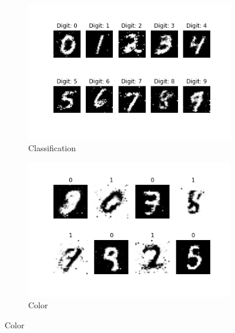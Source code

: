\documentclass[11pt, letterpaper, oneside]{article}
\begin{document}
\begin{figure}
    \begin{subfigure}{.5\textwidth}
      \centering
      \includegraphics[width=1\linewidth]{classification.png}  
      \caption{Classification}
      \label{fig:sub-first}
    \end{subfigure}
    \begin{subfigure}{.5\textwidth}
      \centering
      \includegraphics[width=1\linewidth]{inv.png}  
      \caption{Color}
      \label{fig:sub-second}
    \end{subfigure}

\newline


\end{figure}
\end{document}
